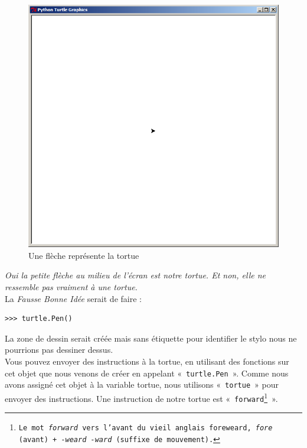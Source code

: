 \begin{figure}[ht!]
\centering
\includegraphics[scale=0.4]{images/turtle_debut.png}
\caption{Une flèche représente la tortue}
\label{fig:turtledebut}
\end{figure}

\emph{Oui la petite flèche au milieu de l'écran est notre tortue. Et non, elle ne ressemble pas vraiment à une tortue.}\\

La \emph{Fausse Bonne Idée} serait de faire :

\begin{Verbatim}[frame=single,rulecolor=\color{red}, label=erreur]
>>> turtle.Pen()
\end{Verbatim}

La zone de dessin serait créée mais sans étiquette pour identifier le stylo nous ne pourrions pas dessiner dessus.\\


Vous pouvez envoyer des instructions à la tortue, en utilisant des fonctions sur cet objet que nous venons de créer en appelant «~\texttt{turtle.Pen}~». Comme nous avons assigné cet objet à la variable tortue, nous utilisons «~\texttt{tortue}~» pour envoyer des instructions. Une instruction de notre tortue est «~\texttt{forward\footnote{Le mot \emph{forward} vers l'avant du vieil anglais foreweard,  \emph{fore} (avant) + \emph{-weard -ward} (suffixe de mouvement).}}~».


